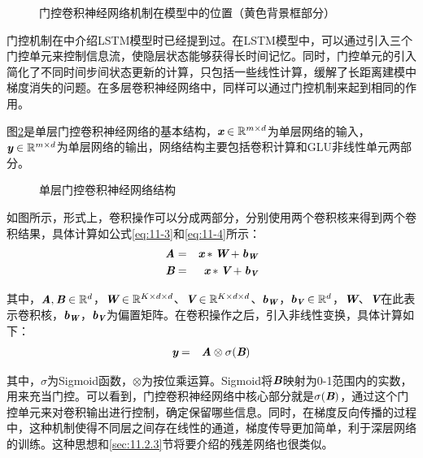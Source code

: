 \begin{figure}[htp]
\centering

\caption{门控卷积神经网络机制在模型中的位置（黄色背景框部分）}
\label{fig:11-13}
\end{figure}

\parinterval 门控机制在{\chapterten}中介绍LSTM模型时已经提到过。在LSTM模型中，可以通过引入三个门控单元来控制信息流，使隐层状态能够获得长时间记忆。同时，门控单元的引入简化了不同时间步间状态更新的计算，只包括一些线性计算，缓解了长距离建模中梯度消失的问题。在多层卷积神经网络中，同样可以通过门控机制来起到相同的作用。

\parinterval 图\ref{fig:11-14}是单层门控卷积神经网络的基本结构，$\textbf{\em x}\in \mathbb{R}^{m\times d}$为单层网络的输入，$\textbf{\em y} \in \mathbb{R}^{m \times d}$为单层网络的输出，网络结构主要包括卷积计算和GLU非线性单元两部分。

\begin{figure}[htp]
\centering

\caption{单层门控卷积神经网络结构}
\label{fig:11-14}
\end{figure}


\parinterval 如图所示，形式上，卷积操作可以分成两部分，分别使用两个卷积核来得到两个卷积结果，具体计算如公式\eqref{eq:11-3}和\eqref{eq:11-4}所示：
\begin{eqnarray}
\textbf{\em A} & = & \textbf{\em x} * \textbf{\em W} + \textbf{\em b}_{\textbf{\em W}} \label{eq:11-3} \\
\textbf{\em B} & = & \textbf{\em x} * \textbf{\em V} + \textbf{\em b}_{\textbf{\em V}} \label{eq:11-4}
\end{eqnarray}

\noindent 其中，$\textbf{\em A},\textbf{\em B}\in \mathbb{R}^d$，$\textbf{\em W}\in \mathbb{R}^{K\times d \times d}$、$\textbf{\em V}\in \mathbb{R}^{K\times d \times d}$、$\textbf{\em b}_{\textbf{\em W}}$，$\textbf{\em b}_{\textbf{\em V}} \in \mathbb{R}^d $，$\textbf{\em W}$、$\textbf{\em V}$在此表示卷积核，$\textbf{\em b}_{\textbf{\em W}}$，$\textbf{\em b}_{\textbf{\em V}}$为偏置矩阵。在卷积操作之后，引入非线性变换，具体计算如下：
\begin{eqnarray}
\textbf{\em y} & = & \textbf{\em A} \otimes \sigma ( \textbf{\em B} )
\label{eq:11-5}
\end{eqnarray}

\noindent 其中，$\sigma$为Sigmoid函数，$\otimes$为按位乘运算。Sigmoid将$\textbf{\em B}$映射为0-1范围内的实数，用来充当门控。可以看到，门控卷积神经网络中核心部分就是$\sigma ( \textbf{\em B} )$，通过这个门控单元来对卷积输出进行控制，确定保留哪些信息。同时，在梯度反向传播的过程中，这种机制使得不同层之间存在线性的通道，梯度传导更加简单，利于深层网络的训练。这种思想和\ref{sec:11.2.3}节将要介绍的残差网络也很类似。

